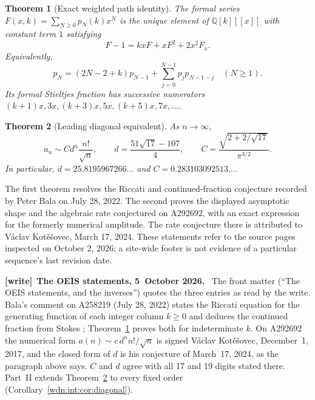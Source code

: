 \documentclass[11pt,letterpaper]{article}
\newtheorem{theorem}{Theorem}[section]
\theoremstyle{remark}\newtheorem{remark}[theorem]{Remark}
\newcommand{\Q}{\mathbb Q}
\newenvironment{writenote}[1][]{\par\smallskip\begingroup\small
 \noindent\textbf{[write]}\if\relax\detokenize{#1}\relax\else~\textbf{#1.}\fi\ }%
 {\par\endgroup\smallskip}
\begin{document}
\begin{theorem}[Exact weighted path identity]\label{wdn:dia:thm:bridge}
The formal series $F(x,k)=\sum_{N\ge0}p_N(k)x^N$ is the unique element of
$\Q[k][[x]]$ with constant term $1$ satisfying
\begin{equation}\label{wdn:dia:eq:riccati}
 F-1=kxF+xF^2+2x^2F_x.
\end{equation}
Equivalently,
\begin{equation}\label{wdn:dia:eq:prec}
 p_N=(2N-2+k)p_{N-1}+\sum_{j=0}^{N-1}p_jp_{N-1-j}\quad(N\ge1).
\end{equation}
Its formal Stieltjes fraction has successive numerators
$(k+1)x,3x,(k+3)x,5x,(k+5)x,7x,\ldots$.
\end{theorem}

\begin{theorem}[Leading diagonal equivalent]\label{wdn:dia:thm:main}
As $n\to\infty$,
\begin{equation}\label{wdn:dia:eq:main}
 a_n\sim C d^n\frac{n!}{\sqrt n},\qquad
 d=\frac{51\sqrt{17}-107}{4},\qquad
 C=\frac{\sqrt{2+2/\sqrt{17}}}{\pi^{3/2}}.
\end{equation}
In particular, $d=25.8195967266\ldots$ and $C=0.283103092513\ldots$.
\end{theorem}

The first theorem resolves the Riccati and continued-fraction conjecture
recorded by Peter Bala on July 28, 2022. The second proves the displayed
asymptotic shape and the algebraic rate conjectured on A292692, with an exact
expression for the formerly numerical amplitude. The rate conjecture there
is attributed to V\'aclav Kot\v{e}\v{s}ovec, March 17, 2024. These statements
refer to the source pages inspected on October 2, 2026; a site-wide footer is
not evidence of a particular sequence's last revision date.

\begin{writenote}[The OEIS statements, 5~October 2026]
The front matter (``The OEIS statements, and the inverses'') quotes the three entries as read by the write. Bala's comment on A258219 (July 28, 2022) states the Riccati equation for the generating function of each integer column $k\ge0$ and deduces the continued fraction from Stokes \cite{Stokes}; Theorem~\ref{wdn:dia:thm:bridge} proves both for indeterminate $k$. On A292692 the numerical form $a(n)\sim c\,d^nn!/\sqrt n$ is signed V\'aclav Kot\v{e}\v{s}ovec, December~1, 2017, and the closed form of $d$ is his conjecture of March~17, 2024, as the paragraph above says. $C$ and $d$ agree with all 17 and 19 digits stated there. Part~II extends Theorem~\ref{wdn:dia:thm:main} to every fixed order (Corollary~\ref{wdn:int:cor:diagonal}).
\end{writenote}
\end{document}
